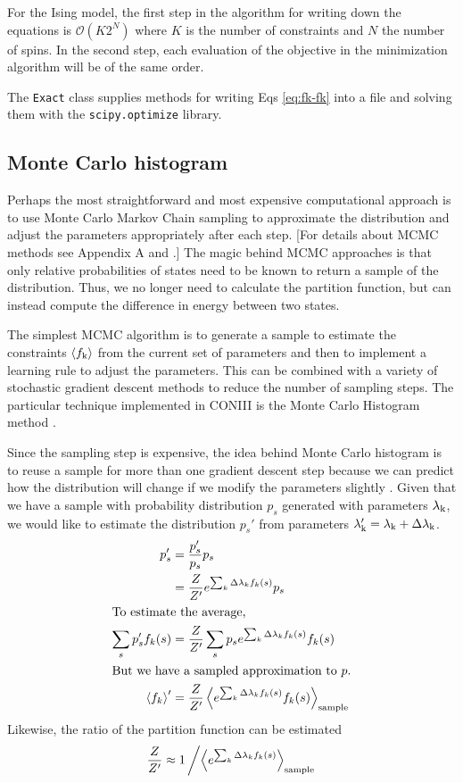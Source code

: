 \documentclass[aps,prl,twocolumn]{revtex4-1}
\begin{document}
For the Ising model, the first step in the algorithm for writing down the equations is $\mathcal{O}(K 2^{N})$ where $K$ is the number of constraints and $N$ the number of spins. In the second step, each evaluation of the objective in the minimization algorithm will be of the same order.

The {\tt Exact} class supplies methods for writing Eqs \ref{eq:fk-fk} into a file and solving them with the {\tt scipy.optimize} library.


\subsection{Monte Carlo histogram}
Perhaps the most straightforward and most expensive computational approach is to use Monte Carlo Markov Chain sampling to approximate the distribution and adjust the parameters appropriately after each step. [For details about MCMC methods see Appendix A and \cite{MacKay:2005wc}.] The magic behind MCMC approaches is that only relative probabilities of states need to be known to return a sample of the distribution. Thus, we no longer need to calculate the partition function, but can instead compute the difference in energy between two states.

The simplest MCMC algorithm is to generate a sample to estimate the constraints $\left<f_{\rm k}\right>$ from the current set of parameters and then to implement a learning rule to adjust the parameters. This can be combined with a variety of stochastic gradient descent methods to reduce the number of sampling steps. The particular technique implemented in CONIII is the Monte Carlo Histogram method \cite{Broderick:2007wq}.

Since the sampling step is expensive, the idea behind Monte Carlo histogram is to reuse a sample for more than one gradient descent step because we can predict how the distribution will change if we modify the parameters slightly \cite{Broderick:2007wq}. Given that we have a sample with probability distribution $p_s$ generated with parameters $\lambda_{\rm k}$, we would like to estimate the distribution $p_s'$ from parameters $\lambda_{\rm k}' = \lambda_{\rm k}+\Delta\lambda_{\rm k}$.
\begin{align}
	p_s' &= \frac{p'_s}{p_s}p_s\\
		&= \frac{Z}{Z'}e^{\sum_k \Delta\lambda_k f_k(s)} p_s\\
\intertext{To estimate the average,}
	\sum_s p_s' f_k(s) &= \frac{Z}{Z'} \sum_s p_s e^{\sum_k \Delta\lambda_k f_k(s)} f_k(s)\\
\intertext{But we have a sampled approximation to $p$.}
	\left<f_k\right>' &= \frac{Z}{Z'} \left<e^{\sum_k \Delta\lambda_k f_k(s)} f_k(s)\right>_{\rm sample}
\end{align}
Likewise, the ratio of the partition function can be estimated
\begin{align}
	\frac{Z}{Z'} \approx 1\left/\left<e^{\sum_k \Delta\lambda_k f_k(s)}\right>_{\rm sample}\right.
\end{align}
\end{document}
